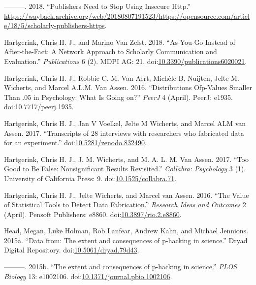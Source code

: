 \documentclass[a5paper]{book}
\begin{document}
\hypertarget{ref-https-hartgerink}{}
---------. 2018. ``Publishers Need to Stop Using Insecure Http.''
\url{https://wayback.archive.org/web/20180807191523/https://opensource.com/article/18/5/scholarly-publishers-https}.

\hypertarget{ref-doi:10.3390ux2fpublications6020021}{}
Hartgerink, Chris H. J., and Marino Van Zelst. 2018. ``As-You-Go Instead
of After-the-Fact: A Network Approach to Scholarly Communication and
Evaluation.'' \emph{Publications} 6 (2). MDPI AG: 21.
doi:\href{https://doi.org/10.3390/publications6020021}{10.3390/publications6020021}.

\hypertarget{ref-doi:10.7717ux2fpeerj.1935}{}
Hartgerink, Chris H. J., Robbie C. M. Van Aert, Michèle B. Nuijten,
Jelte M. Wicherts, and Marcel A.L.M. Van Assen. 2016. ``Distributions
Ofp-Values Smaller Than .05 in Psychology: What Is Going on?''
\emph{PeerJ} 4 (April). PeerJ: e1935.
doi:\href{https://doi.org/10.7717/peerj.1935}{10.7717/peerj.1935}.

\hypertarget{ref-doi:10.5281ux2fzenodo.832490}{}
Hartgerink, Chris H. J., Jan V Voelkel, Jelte M Wicherts, and Marcel ALM
van Assen. 2017. ``Transcripts of 28 interviews with researchers who
fabricated data for an experiment.''
doi:\href{https://doi.org/10.5281/zenodo.832490}{10.5281/zenodo.832490}.

\hypertarget{ref-doi:10.1525ux2fcollabra.71}{}
Hartgerink, Chris H. J., J. M. Wicherts, and M. A. L. M. Van Assen.
2017. ``Too Good to Be False: Nonsignificant Results Revisited.''
\emph{Collabra: Psychology} 3 (1). University of California Press: 9.
doi:\href{https://doi.org/10.1525/collabra.71}{10.1525/collabra.71}.

\hypertarget{ref-doi:10.3897ux2frio.2.e8860}{}
Hartgerink, Chris H. J., Jelte Wicherts, and Marcel van Assen. 2016.
``The Value of Statistical Tools to Detect Data Fabrication.''
\emph{Research Ideas and Outcomes} 2 (April). Pensoft Publishers: e8860.
doi:\href{https://doi.org/10.3897/rio.2.e8860}{10.3897/rio.2.e8860}.

\hypertarget{ref-doi:10.5061ux2fdryad.79d43}{}
Head, Megan, Luke Holman, Rob Lanfear, Andrew Kahn, and Michael
Jennions. 2015a. ``Data from: The extent and consequences of p-hacking
in science.'' Dryad Digital Repository.
doi:\href{https://doi.org/10.5061/dryad.79d43}{10.5061/dryad.79d43}.

\hypertarget{ref-doi:10.1371ux2fjournal.pbio.1002106}{}
---------. 2015b. ``The extent and consequences of p-hacking in
science.'' \emph{PLOS Biology} 13: e1002106.
doi:\href{https://doi.org/10.1371/journal.pbio.1002106}{10.1371/journal.pbio.1002106}.
\end{document}
